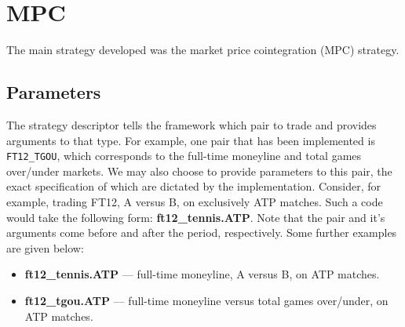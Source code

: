 \section{MPC}
The main strategy developed was the market price cointegration (MPC) strategy.

\subsection*{Parameters}
The strategy descriptor tells the framework which pair to trade and provides
arguments to that type.  For example, one pair that has been implemented is
\texttt{FT12_TGOU}, which corresponds to the full-time moneyline
and total games over/under markets. We may also choose to provide parameters to
this pair, the exact specification of which are dictated by the implementation.
Consider, for example, trading FT12, A versus B, on exclusively ATP matches.
Such a code would take the following form: \textbf{ft12\_tennis.ATP}. Note that
the pair and it's arguments come before and after the period, respectively.
Some further examples are given below:
\begin{itemize}
    \item \textbf{ft12\_tennis.ATP} --- full-time moneyline, A versus B, on ATP
        matches.
    \item \textbf{ft12\_tgou.ATP} --- full-time moneyline versus total games
        over/under, on ATP matches.
\end{itemize}


